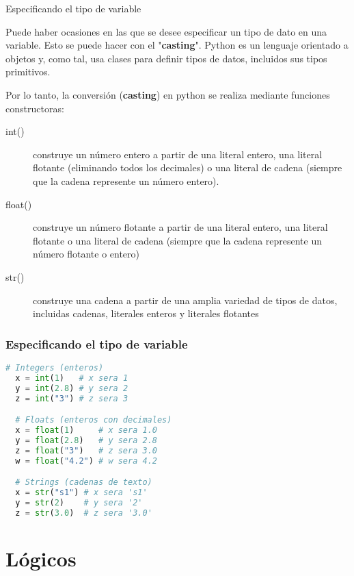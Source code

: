 \begin{frame}[c]{Especificando el tipo de variable}

  \vspace{\baselineskip}
  Puede haber ocasiones en las que se desee especificar un tipo de dato en una
  variable. Esto se puede hacer con el "\textbf{casting}". Python es un
  lenguaje orientado a objetos y, como tal, usa clases para definir tipos de
  datos, incluidos sus tipos primitivos.

  \pausa
  \vspace{\baselineskip}
  Por lo tanto, la conversión (\textbf{casting}) en python se realiza
  mediante funciones constructoras:

  \vspace{\baselineskip}
  \begin{description}
    \item[int()] construye un número entero a partir de una literal entero,
      una literal flotante (eliminando todos los decimales) o una literal
      de cadena (siempre que la cadena represente un número entero).
    \pausa
    \item[float()] construye un número flotante a partir de una literal
      entero, una literal flotante o una literal de cadena (siempre que la
      cadena represente un número flotante o entero)
    \pausa
    \item[str()] construye una cadena a partir de una amplia variedad de
      tipos de datos, incluidas cadenas, literales enteros y literales
      flotantes
  \end{description}
\end{frame}

\begin{frame}[fragile]
  \frametitle{Especificando el tipo de variable}
  \begin{lstlisting}[language=Python]
  # Integers (enteros)
  x = int(1)   # x sera 1
  y = int(2.8) # y sera 2
  z = int("3") # z sera 3

  # Floats (enteros con decimales)
  x = float(1)     # x sera 1.0
  y = float(2.8)   # y sera 2.8
  z = float("3")   # z sera 3.0
  w = float("4.2") # w sera 4.2

  # Strings (cadenas de texto)
  x = str("s1") # x sera 's1'
  y = str(2)    # y sera '2'
  z = str(3.0)  # z sera '3.0'
  \end{lstlisting}
\end{frame}

\section{Lógicos}

